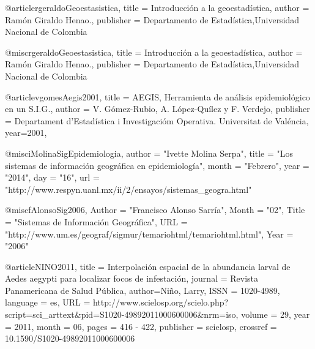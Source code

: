 @article{rgeraldoGeoestasistica,
  title = {Introducción a la geoestadística},
  author = {Ramón Giraldo Henao.},
  publisher = {Departamento de Estadística,Universidad Nacional de Colombia}
}

@misc{rgeraldoGeoestasistica,
  title = {Introducción a la geoestadística},
  author = {Ramón Giraldo Henao.},
  publisher = {Departamento de Estadística,Universidad Nacional de Colombia}
}

@article{vgomesAegis2001,
  title = {AEGIS, Herramienta de análisis epidemiológico en un S.I.G.},
  author = {V. Gómez-Rubio, A. López-Quílez y F. Verdejo},
  publisher = {Departament d’Estadística i Investigacióm Operativa. Universitat de Valéncia},
  year={2001},
}

@misc{iMolinaSigEpidemiologia,
      author = "Ivette Molina Serpa",
      title = "Los sistemas de información geográfica en epidemiología",
      month = "Febrero",
      year = "2014",
      day = "16",
      url = "http://www.respyn.uanl.mx/ii/2/ensayos/sistemas_geogra.html"
}

@misc{fAlonsoSig2006,
    Author = "Francisco Alonso Sarría",
    Month = "02",
    Title = "Sistemas de Información Geográfica",
    URL = "http://www.um.es/geograf/sigmur/temariohtml/temariohtml.html",
    Year = "2006"
}

@article{NINO2011,
   title = {Interpolación espacial de la abundancia larval de Aedes aegypti para localizar focos de infestación},
   journal = {Revista Panamericana de Salud Pública},
   author={Niño, Larry},
   ISSN = {1020-4989},
   language = {es},
   URL = {http://www.scielosp.org/scielo.php?script=sci_arttext&pid=S1020-49892011000600006&nrm=iso},
   volume = {29},
   year = {2011},
   month = {06},
   pages = {416 - 422},
   publisher = {scielosp},
   crossref = {10.1590/S1020-49892011000600006}
}

